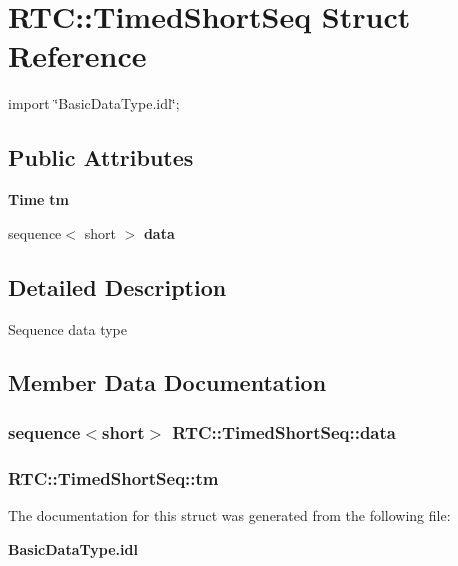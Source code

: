 \section{RTC::TimedShortSeq Struct Reference}
\label{structRTC_1_1TimedShortSeq}


{\ttfamily import \char`\"{}BasicDataType.idl\char`\"{};}

\subsection*{Public Attributes}
\begin{DoxyCompactItemize}
\item 
{\bf Time} {\bf tm}
\item 
sequence$<$ short $>$ {\bf data}
\end{DoxyCompactItemize}


\subsection{Detailed Description}
Sequence data type 

\subsection{Member Data Documentation}
\subsubsection[{data}]{\setlength{\rightskip}{0pt plus 5cm}sequence$<$short$>$ {\bf RTC::TimedShortSeq::data}}\label{structRTC_1_1TimedShortSeq_a2bda3791a0078670c6850599b7f241c8}
\subsubsection[{tm}]{ {\bf RTC::TimedShortSeq::tm}}\label{structRTC_1_1TimedShortSeq_a3485de1d082d6e35350e11fb13820d27}


The documentation for this struct was generated from the following file:\begin{DoxyCompactItemize}
\item 
{\bf BasicDataType.idl}\end{DoxyCompactItemize}
